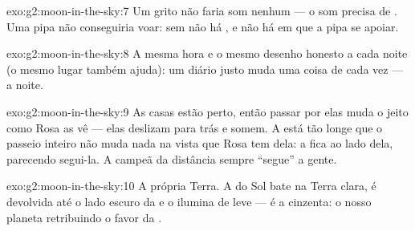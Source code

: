 \begin{solution}{exo:g2:moon-in-the-sky:7}
Um grito não faria som nenhum --- o som precisa de . Uma pipa não
conseguiria voar: sem  não há , e não há em que a pipa se
apoiar.
\end{solution}

\begin{solution}{exo:g2:moon-in-the-sky:8}
A mesma hora e o mesmo desenho honesto a cada noite (o mesmo lugar
também ajuda): um diário justo muda uma coisa de cada vez --- a
noite.
\end{solution}

\begin{solution}{exo:g2:moon-in-the-sky:9}
As casas estão perto, então passar por elas muda o jeito como Rosa as
vê --- elas deslizam para trás e somem. A  está tão longe que o
passeio inteiro não muda nada na vista que Rosa tem dela: a  fica
ao lado dela, parecendo segui-la. A campeã da distância sempre
``segue'' a gente.
\end{solution}

\begin{solution}{exo:g2:moon-in-the-sky:10}
A própria Terra. A  do Sol bate na Terra clara, é devolvida até o
lado escuro da  e o ilumina de leve --- é a  cinzenta: o nosso
planeta retribuindo o favor da .
\end{solution}
